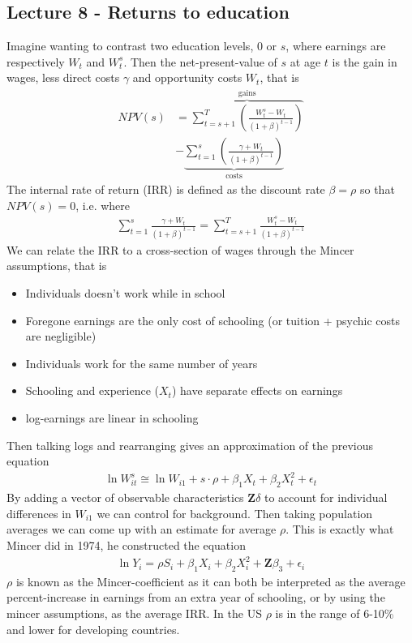 \documentclass[12pt, a4paper]{article}
\begin{document}
\begin{multicols}{2}
\subsection{Lecture 8 - Returns to education}
Imagine wanting to contrast two education levels, 0 or $s$, where earnings are respectively $W_t$ and $W_t^s$. Then the net-present-value of $s$ at age $t$ is the gain in wages, less direct costs $\gamma$ and opportunity costs $W_t$, that is
\begin{align*}
NPV(s) &= \overbrace{\sum_{t=s+1}^T \left( \frac{W_t^s - W_t}{(1+\beta)^{t-1}} \right)}^{\text{gains}} \\
& -\underbrace{\sum_{t=1}^s \left( \frac{\gamma + W_t}{(1+\beta)^{t-1}} \right)}_{\text{costs}}
\end{align*}
The internal rate of return (IRR) is defined as the discount rate $\beta = \rho$ so that $NPV(s) = 0$, i.e. where
\begin{align*}
\sum_{t=1}^s \frac{\gamma + W_t}{(1+\beta)^{t-1}} = \sum_{t=s+1}^T \frac{W_t^s - W_t}{(1+\beta)^{t-1}}
\end{align*}
We can relate the IRR to a cross-section of wages through the Mincer assumptions, that is
\begin{itemize}
\item Individuals doesn't work while in school
\item Foregone earnings are the only cost of schooling (or tuition + psychic costs are negligible)
\item Individuals work for the same number of years
\item Schooling and experience ($X_t$) have separate effects on earnings
\item log-earnings are linear in schooling
\end{itemize}
Then talking logs and rearranging gives an approximation of the previous equation
\begin{align*}
\ln W_{it}^s \cong \ln W_{i1} +s \cdot \rho + \beta_1 X_t + \beta_2 X_t^2 + \epsilon_t
\end{align*}
By adding a vector of observable characteristics $\mathbf{Z}\delta$ to account for individual differences in $W_{i1}$ we can control for background. Then taking population averages we can come up with an estimate for average $\rho$. This is exactly what Mincer did in 1974, he constructed the equation
\begin{align*}
\ln Y_i = \rho S_i + \beta_1 X_i + \beta_2 X_i^2 + \mathbf{Z}\beta_3 + \epsilon_i
\end{align*}
$\rho$ is known as the Mincer-coefficient as it can both be interpreted as the average percent-increase in earnings from an extra year of schooling, or by using the mincer assumptions, as the average IRR. In the US $\rho$ is in the range of 6-10\% and lower for developing countries.


\end{multicols}
\end{document}
